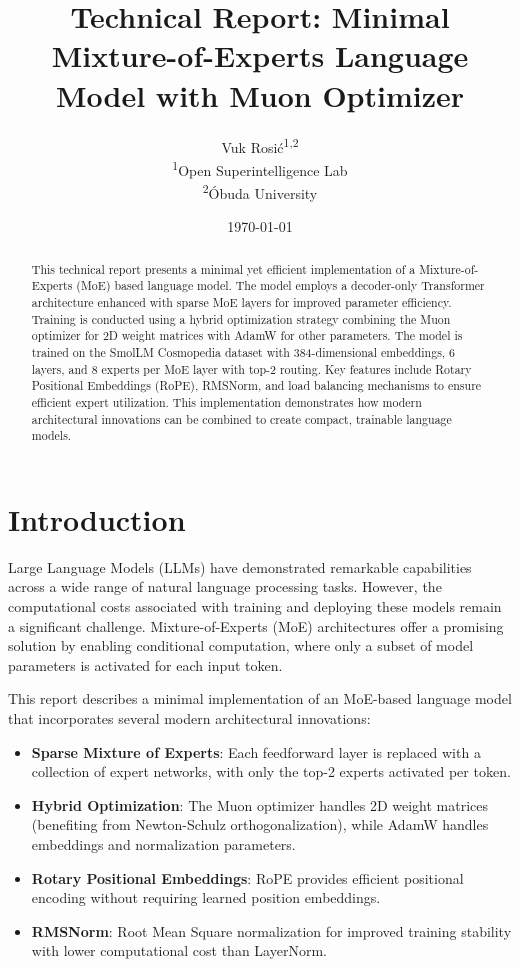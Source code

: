 \documentclass[11pt,a4paper]{article}
\title{\textbf{Technical Report: Minimal Mixture-of-Experts Language Model with Muon Optimizer}}
\author{
    Vuk Rosić\textsuperscript{1,2} \\
    \textsuperscript{1}Open Superintelligence Lab \\
    \textsuperscript{2}Óbuda University
}
\date{\today}
\begin{document}
\maketitle

\begin{abstract}
This technical report presents a minimal yet efficient implementation of a Mixture-of-Experts (MoE) based language model. The model employs a decoder-only Transformer architecture enhanced with sparse MoE layers for improved parameter efficiency. Training is conducted using a hybrid optimization strategy combining the Muon optimizer for 2D weight matrices with AdamW for other parameters. The model is trained on the SmolLM Cosmopedia dataset with 384-dimensional embeddings, 6 layers, and 8 experts per MoE layer with top-2 routing. Key features include Rotary Positional Embeddings (RoPE), RMSNorm, and load balancing mechanisms to ensure efficient expert utilization. This implementation demonstrates how modern architectural innovations can be combined to create compact, trainable language models.
\end{abstract}

\section{Introduction}

Large Language Models (LLMs) have demonstrated remarkable capabilities across a wide range of natural language processing tasks. However, the computational costs associated with training and deploying these models remain a significant challenge. Mixture-of-Experts (MoE) architectures offer a promising solution by enabling conditional computation, where only a subset of model parameters is activated for each input token.

This report describes a minimal implementation of an MoE-based language model that incorporates several modern architectural innovations:
\begin{itemize}
    \item \textbf{Sparse Mixture of Experts}: Each feedforward layer is replaced with a collection of expert networks, with only the top-2 experts activated per token.
    \item \textbf{Hybrid Optimization}: The Muon optimizer handles 2D weight matrices (benefiting from Newton-Schulz orthogonalization), while AdamW handles embeddings and normalization parameters.
    \item \textbf{Rotary Positional Embeddings}: RoPE provides efficient positional encoding without requiring learned position embeddings.
    \item \textbf{RMSNorm}: Root Mean Square normalization for improved training stability with lower computational cost than LayerNorm.
\end{itemize}
\end{document}
